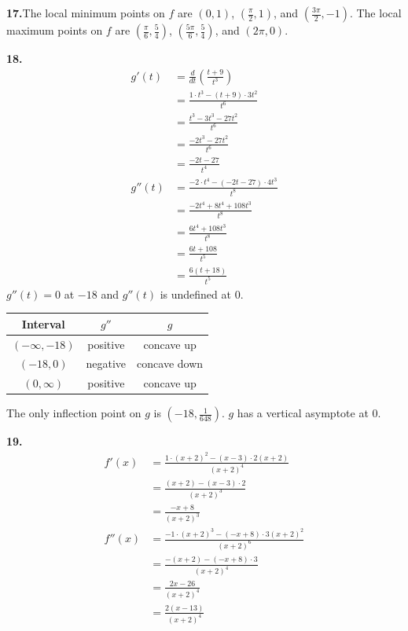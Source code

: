 \documentclass[10pt,oneside,]{book}
\theoremstyle{plain}
\theoremstyle{definition}
\numberwithin{equation}{section}
\newcommand{\fe}[2]{#1\mathopen{}\left(#2\right)\mathclose{}}
\newcommand{\ointerval}[2]{\left(#1,#2\right)}
\newcommand{\point}[2]{\left(#1,#2\right)}
\newcommand{\fd}[1]{#1'}
\newcommand{\sd}[1]{#1''}
\newcommand{\lzoo}[2]{{\frac{d}{d#1}}{\left(#2\right)}}
\begin{document}
\par\smallskip
\noindent\textbf{17.}\quad{}The local minimum points on \(f\) are \(\point{0}{1}\), \(\point{\frac{\pi}{2}}{1}\), and \(\point{\frac{3\pi}{2}}{-1}\).  The local maximum points on \(f\) are \(\point{\frac{\pi}{6}}{\frac{5}{4}}\), \(\point{\frac{5\pi}{6}}{\frac{5}{4}}\), and \(\point{2\pi}{0}\).%
\par\smallskip
\noindent\textbf{18.}\quad{}\begin{align*}
\fe{\fd{g}}{t}&=\lzoo{t}{\frac{t+9}{t^3}}\\
&=\frac{1\cdot t^3-(t+9)\cdot3t^2}{t^6}\\
&=\frac{t^3-3t^3-27t^2}{t^6}\\
&=\frac{-2t^3-27t^2}{t^6}\\
&=\frac{-2t-27}{t^4}\\
\fe{\sd{g}}{t}&=\frac{-2\cdot t^4-(-2t-27)\cdot4t^3}{t^8}\\
&=\frac{-2t^4+8t^4+108t^3}{t^8}\\
&=\frac{6t^4+108t^3}{t^8}\\
&=\frac{6t+108}{t^5}\\
&=\frac{6(t+18)}{t^5}
\end{align*}\(\fe{\sd{g}}{t}=0\) at \(-18\) and \(\fe{\sd{g}}{t}\) is undefined at \(0\).%
\begin{tabular}{ccc}
\toprule
Interval&\(\sd{g}\)&\(g\)\\
\midrule
\(\ointerval{-\infty}{-18}\)&positive&concave up\\
\midrule
\(\ointerval{-18}{0}\)&negative&concave down\\
\midrule
\(\ointerval{0}{\infty}\)&positive&concave up\\
\bottomrule
\end{tabular}
\par
The only inflection point on \(g\) is \(\point{-18}{\frac{1}{648}}\). \(g\) has a vertical asymptote at \(0\).%
\par\smallskip
\noindent\textbf{19.}\quad{}\begin{align*}
\fe{\fd{f}}{x}&=\frac{1\cdot(x+2)^2-(x-3)\cdot2(x+2)}{(x+2)^4}\\
&=\frac{(x+2)-(x-3)\cdot2}{(x+2)^3}\\
&=\frac{-x+8}{(x+2)^3}\\
\fe{\sd{f}}{x}&=\frac{-1\cdot(x+2)^3-(-x+8)\cdot3(x+2)^2}{(x+2)^6}\\
&=\frac{-(x+2)-(-x+8)\cdot3}{(x+2)^4}\\
&=\frac{2x-26}{(x+2)^4}\\
&=\frac{2(x-13)}{(x+2)^4}
\end{align*}%
\end{document}
